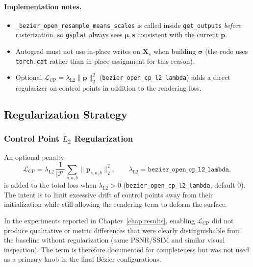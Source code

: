 \paragraph{Implementation notes.}
\begin{itemize}
    \item \texttt{\_bezier\_open\_resample\_means\_scales} is called inside \texttt{get\_outputs} \emph{before} rasterization, so \texttt{gsplat} always sees $\boldsymbol{\mu},\mathbf{s}$ consistent with the current $\mathbf{p}$.
    \item Autograd must not use in-place writes on $\mathbf{X}_s$ when building $\boldsymbol{\sigma}$ (the code uses \texttt{torch.cat} rather than in-place assignment for this reason).
    \item Optional $\mathcal{L}_{\mathrm{CP}}=\lambda_{\mathrm{L2}}\|\mathbf{p}\|_2^2$ (\texttt{bezier\_open\_cp\_l2\_lambda}) adds a direct regularizer on control points in addition to the rendering loss.
\end{itemize}

\subsection{Regularization Strategy}
\label{subsec:bezier_regularization}

\subsubsection{Control Point $L_2$ Regularization}
\label{subsubsec:cp_l2}

An optional penalty
\begin{equation}
\mathcal{L}_{\mathrm{CP}}
=\lambda_{\mathrm{L2}}\,\frac{1}{|\mathcal{P}|}\sum_{s,a,b}\|\mathbf{p}_{s,a,b}\|_2^2,
\qquad
\lambda_{\mathrm{L2}}=\texttt{bezier\_open\_cp\_l2\_lambda},
\label{eq:cp_l2}
\end{equation}
is added to the total loss when $\lambda_{\mathrm{L2}}>0$ (\texttt{bezier\_open\_cp\_l2\_lambda}, default $0$). The intent is to limit excessive drift of control points away from their initialization while still allowing the rendering term to deform the surface.

In the experiments reported in Chapter~\ref{chap:results}, enabling $\mathcal{L}_{\mathrm{CP}}$ did not produce qualitative or metric differences that were clearly distinguishable from the baseline without regularization (same PSNR/SSIM and similar visual inspection). The term is therefore documented for completeness but was not used as a primary knob in the final B\'ezier configurations.

